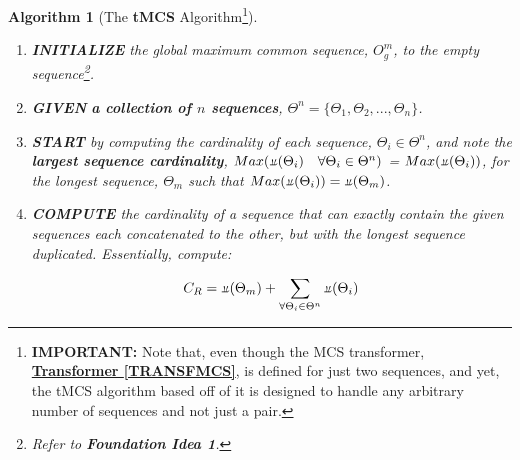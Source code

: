 \documentclass[a4paper, 18pt]{article} %
\newtheorem{alg}{Algorithm}
\newcommand{\invpi}{\rotatebox[origin=c]{180}{$\pi$}}
\begin{document}
\vspace{2em}
\begin{alg}[The \textbf{tMCS} Algorithm\footnote{\textbf{IMPORTANT:} Note that, even though the MCS transformer, \textbf{\hyperref[TRANSFMCS]{Transformer \ref{TRANSFMCS}}}, is defined for just two sequences, and yet, the tMCS algorithm based off of it is designed to handle any arbitrary number of sequences and not just a pair.}]
\label{ALGtMCS}
$ $
\begin{enumerate}
\item{\textbf{INITIALIZE} the global maximum common sequence, $O^m_g$, to the empty sequence\footnote{Refer to \textbf{Foundation Idea 1}\cite{Lutalo2025_transformatics_thesis}.}.} 
\item{
\textbf{GIVEN}  \textbf{a collection of $n$ sequences}, $\Theta^n = \{\Theta_1, \Theta_2,..., \Theta_n\}$.
}
\item{
\textbf{START}  by computing the cardinality of each sequence, $\Theta_i \in \Theta^n$, and note the \textbf{largest sequence cardinality}, $Max(\invpi(\Theta_i) \quad \forall \Theta_i \in \Theta^n)$ = $Max(\invpi(\Theta_i))$, for the longest sequence, $\Theta_m$ such that $Max(\invpi(\Theta_i)) = \invpi(\Theta_m)$.
}
\item {
\textbf{COMPUTE}  the cardinality of a sequence that can exactly contain the given sequences each concatenated to the other, but with the longest sequence duplicated. Essentially, compute:

\begin{equation}
\label{EQLSEQ}
C_R = \invpi(\Theta_m) + \sum\limits_{\forall \Theta_i \in \Theta^n} \invpi(\Theta_i)
\end{equation}

}
\end{enumerate}
\end{alg}
\end{document}
